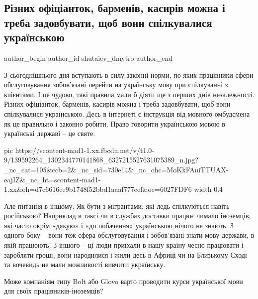  
 
 
 
 

\subsection{Різних офіціанток, барменів, касирів можна і треба задовбувати, щоб вони спілкувалися українською}
\ifcmt
  author_begin
   author_id shutaiev_dmytro
  author_end
\fi

З сьогоднішнього дня вступають в силу законні норми, по яких працівники сфери
обслуговування зобов’язані перейти на українську мову при спілкуванні з
клієнтами. І це чудово, такі правила мали б діяти ще з перших днів
незалежності. Різних офіціанток, барменів, касирів можна і треба задовбувати,
щоб вони спілкувалися українською. Десь в інтернеті є інструкція від мовного
омбудсмена як це правильно і законно робити. Право говорити українською мовою в
українські державі – це святе.  

\ifcmt
  pic https://scontent-mad1-1.xx.fbcdn.net/v/t1.0-9/139592264_1302344770141868_6327215527631075389_n.jpg?_nc_cat=105&ccb=2&_nc_sid=730e14&_nc_ohc=MoKkFAuiTTUAX-eajIZ&_nc_ht=scontent-mad1-1.xx&oh=d7c6616ce9b1748f52bbd1aaaf777eef&oe=6027FDF6
  width 0.4
\fi

Але питання в іншому. Як бути з мігрантами, які ледь спілкуються навіть
російською? Наприклад в таксі чи в службах доставки працює чимало іноземців,
які часто окрім «дякую» і «до побачення» українською нічого не знають. З одного
боку – вони теж сфера обслуговування і зобов’язані знати мову держави, в якій
працюють. З іншого – ці люди приїхали в нашу країну чесно працювати і заробляти
гроші, вони народилися і жили десь в Африці чи на Близькому Сході та вочевидь
не мали можливості вивчити українську.  

Може компаніям типу Bolt або Glovo варто проводити курси української мови для
своїх працівників-іноземців?
